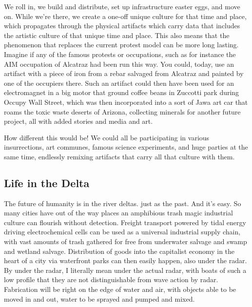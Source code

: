 We roll in, we build and distribute, set up infrastructure easter eggs,
and move on. While we're there, we create a one-off unique culture for
that time and place, which propagates through the physical artifacts
which carry data that includes the artistic culture of that unique time
and place. This also means that the phenomenon that replaces the current
protest model can be more long lasting. Imagine if any of the famous
protests or occupations, such as for instance the AIM occupation of
Alcatraz had been run this way. You could, today, use an artifact with a
piece of iron from a rebar salvaged from Alcatraz and painted by one of
the occupiers there. Such an artifact could then have been used for an
electromagnet in a big motor that ground coffee beans in Zuccotti park
during Occupy Wall Street, which was then incorporated into a sort of
Jawa art car that roams the toxic waste deserts of Arizona, collecting
minerals for another future project, all with added stories and media
and art.

How different this would be! We could all be participating in various
insurrections, art communes, famous science experiments, and huge
parties at the same time, endlessly remixing artifacts that carry all
that culture with them.

\subsection{Life in the Delta}\label{life-in-the-delta}

The future of humanity is in the river deltas. just as the past. And
it's easy. So many cities have out of the way places an amphibious trash
magic industrial culture can flourish without detection. Freight
transport powered by tidal energy driving electrochemical cells can be
used as a universal industrial supply chain, with vast amounts of trash
gathered for free from underwater salvage and swamp and wetland salvage.
Distribution of goods into the capitalist economy in the heart of a city
via waterfront parks can then easily happen, also under the radar. By
under the radar, I literally mean under the actual radar, with boats of
such a low profile that they are not distinguishable from wave action by
radar. Fabrication will be right on the edge of water and air, with
objects able to be moved in and out, water to be sprayed and pumped and
mixed.

